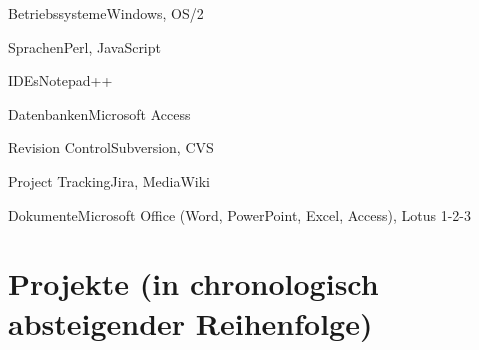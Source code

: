 \documentclass{germanqualificationprofile}
\begin{document}
  \begin{qptable}{Betriebssysteme}Windows, OS/2\end{qptable}
  \begin{qptable}{Sprachen}Perl, JavaScript\end{qptable}
  \begin{qptable}{IDEs}Notepad++\end{qptable}
  \begin{qptable}{Datenbanken}Microsoft Access\end{qptable}
  \begin{qptable}{Revision Control}Subversion, CVS\end{qptable}
  \begin{qptable}{Project Tracking}Jira, MediaWiki\end{qptable}
  \begin{qptable}{Dokumente}Microsoft Office (Word, PowerPoint, Excel, Access), Lotus 1-2-3\end{qptable}

\clearpage

\section*{Projekte (in chronologisch absteigender Reihenfolge)}
\end{document}
